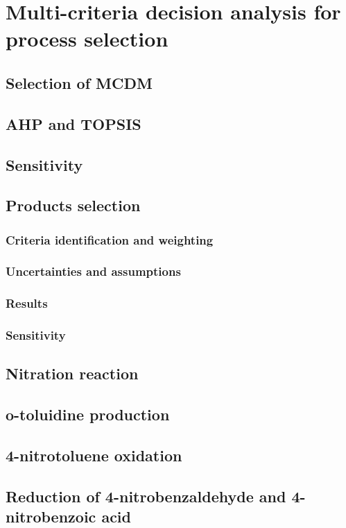 \section{Multi-criteria decision analysis for process selection}

\subsection{Selection of MCDM}


\subsection{AHP and TOPSIS}


\subsection{Sensitivity}

\subsection{Products selection}

\subsubsection{Criteria identification and weighting}

\subsubsection{Uncertainties and assumptions}

\subsubsection{Results}

\subsubsection{Sensitivity}

\subsection{Nitration reaction}

\subsection{o-toluidine production}

\subsection{4-nitrotoluene oxidation}

\subsection{Reduction of 4-nitrobenzaldehyde and 4-nitrobenzoic acid}

\
	
	
	 
	 
	 
	
	
	
	
	
